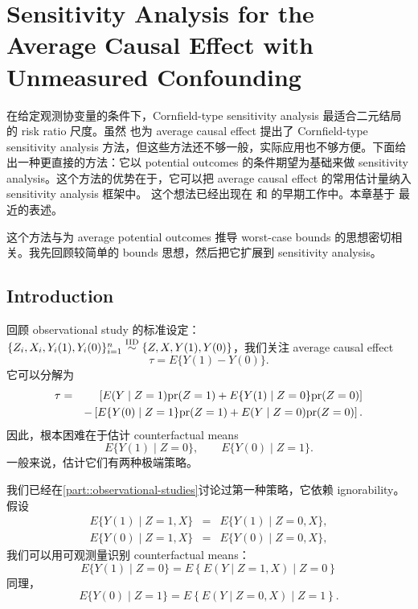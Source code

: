 
\chapter{Sensitivity Analysis for the Average Causal Effect with Unmeasured Confounding}
\label{chapter::sensitivity-ACE}


 
 
 
 
在给定观测协变量的条件下，Cornfield-type sensitivity analysis 最适合二元结局的 risk ratio 尺度。虽然 \citet{ding2016sensitivity} 也为 average causal effect 提出了 Cornfield-type sensitivity analysis 方法，但这些方法还不够一般，实际应用也不够方便。下面给出一种更直接的方法：它以 potential outcomes 的条件期望为基础来做 sensitivity analysis。这个方法的优势在于，它可以把 average causal effect 的常用估计量纳入 sensitivity analysis 框架中。
这个想法已经出现在 \citet{robins1999association} 和 \citet{scharfstein1999adjusting} 的早期工作中。本章基于 \citet{luding2023flexible} 最近的表述。
 
 
 
 
 这个方法与为 average potential outcomes 推导 worst-case bounds 的思想密切相关。我先回顾较简单的 bounds 思想，然后把它扩展到 sensitivity analysis。



\section{Introduction}


回顾 observational study 的标准设定：$\{  Z_i, X_i,  Y_i(1), Y_i(0) \}_{i=1}^n \stackrel{\textup{IID}}{\sim}  \{ Z, X, Y(1), Y(0) \}$，我们关注 average causal effect
$$
\tau = E\{ Y(1) - Y(0) \}.
$$
它可以分解为
\begin{eqnarray*}
\tau &=& \left[  E(Y\mid Z=1) \textup{pr}(Z=1) + E\{ Y(1)\mid Z=0 \} \textup{pr}(Z=0) \right]  \\
&&- \left[   E\{ Y(0)\mid Z=1\} \textup{pr}(Z=1) + E(Y\mid Z=0)  \textup{pr}(Z=0)  \right] . 
\end{eqnarray*}
因此，根本困难在于估计 counterfactual means
$$
E\{ Y(1)\mid Z=0 \}  ,\quad \quad E\{ Y(0)\mid Z=1\}.
$$
一般来说，估计它们有两种极端策略。



我们已经在\cref{part::observational-studies}讨论过第一种策略，它依赖 ignorability。
假设
\begin{eqnarray*}
E\{ Y(1)\mid Z=1, X \} &=& E\{ Y(1)\mid Z=0, X \} ,\\ 
E\{ Y(0)\mid Z=1, X \} &=& E\{ Y(0)\mid Z=0, X \}, 
\end{eqnarray*}
我们可以用可观测量识别 counterfactual means：
$$
E\{ Y(1)\mid Z=0 \}  
= E\left\{  E( Y\mid Z=1, X )  \mid Z=0\right\}
$$
同理，
$$
E\{ Y(0)\mid Z=1\} = E\left\{  E( Y\mid Z=0, X )  \mid Z=1\right\} . 
$$



